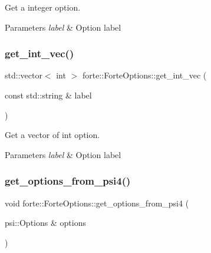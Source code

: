 Get a integer option. 


\begin{DoxyParams}{Parameters}
{\em label} & Option label \\
\hline
\end{DoxyParams}
\mbox{\label{classforte_1_1_forte_options_a4bdd63f32f4c0a81d23ab46bbec5a38c}} 
\subsubsection{\texorpdfstring{get\+\_\+int\+\_\+vec()}{get\_int\_vec()}}
{\footnotesize\ttfamily std\+::vector$<$ int $>$ forte\+::\+Forte\+Options\+::get\+\_\+int\+\_\+vec (\begin{DoxyParamCaption}\item[{const std\+::string \&}]{label }\end{DoxyParamCaption})}



Get a vector of int option. 


\begin{DoxyParams}{Parameters}
{\em label} & Option label \\
\hline
\end{DoxyParams}
\mbox{\label{classforte_1_1_forte_options_a9e02372d36c9460f222769365ea44ac1}} 
\subsubsection{\texorpdfstring{get\+\_\+options\+\_\+from\+\_\+psi4()}{get\_options\_from\_psi4()}}
{\footnotesize\ttfamily void forte\+::\+Forte\+Options\+::get\+\_\+options\+\_\+from\+\_\+psi4 (\begin{DoxyParamCaption}\item[{psi\+::\+Options \&}]{options }\end{DoxyParamCaption})}



